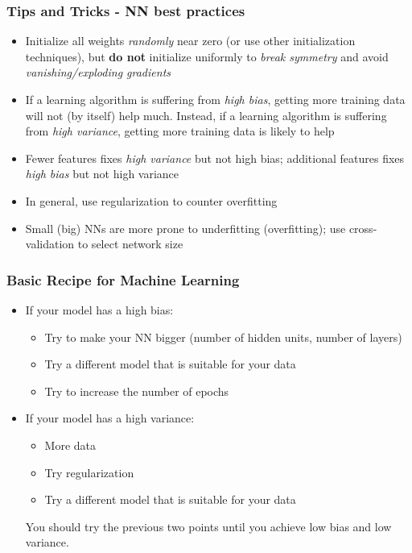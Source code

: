 \documentclass{beamer}
\begin{document}
	\begin{frame}
		\frametitle{Tips and Tricks - NN best practices}
		\begin{itemize}
			\item Initialize all weights \textit{randomly} near zero (or use other initialization techniques), but \textbf{do not} initialize uniformly to \textit{break symmetry} and avoid \textit{vanishing/exploding gradients}
			\item If a learning algorithm is suffering from \textit{high bias}, getting more training data will not (by itself) help much. Instead, if a learning algorithm is suffering from \textit{high variance}, getting more training data is likely to help
			\item Fewer features fixes \textit{high variance} but not high bias; additional features fixes \textit{high bias} but not high variance
			\item In general, use regularization to counter overfitting
			\item Small (big) NNs are more prone to underfitting (overfitting); use cross-validation to select network size
		\end{itemize}
	\end{frame}
	
	\begin{frame}
		\frametitle{Basic Recipe for Machine Learning}
		\begin{itemize}
			\item If your model has a high bias:
			\begin{itemize}
				\item Try to make your NN bigger (number of hidden units, number of layers)
				\item Try a different model that is suitable for your data
				\item Try to increase the number of epochs
			\end{itemize}
			\item If your model has a high variance:
			\begin{itemize}
				\item More data
				\item Try regularization
				\item Try a different model that is suitable for your data
			\end{itemize}
			You should try the previous two points until you achieve low bias and low variance.
		\end{itemize}
	\end{frame}
	
\end{document}
